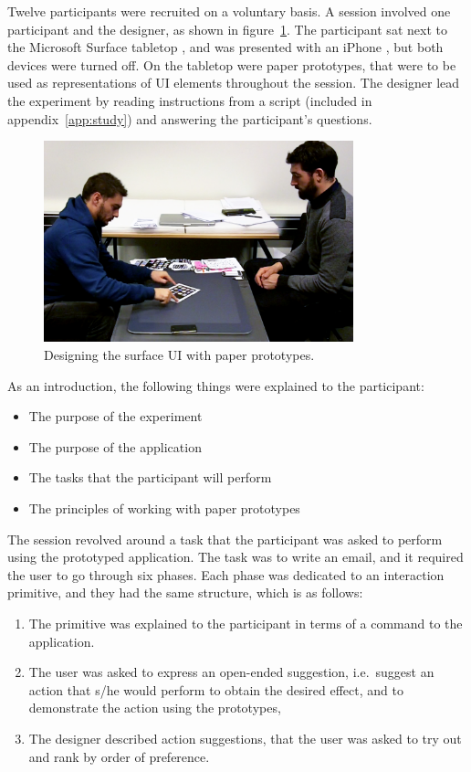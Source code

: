 Twelve participants were recruited on a voluntary basis.
A session involved one participant and the designer, as shown in figure~\ref{fig:studyScreenshot}.
The participant sat next to the Microsoft Surface tabletop \citep{ms}, and was presented with an iPhone \citep{iphone}, but both devices were turned off.
On the tabletop were paper prototypes, that were to be used as representations of UI elements throughout the session.
The designer lead the experiment by reading instructions from a script (included in appendix~\ref{app:study}) and answering the participant's questions.

\begin{figure}[htb]
  \centering
    \includegraphics[width=0.8\textwidth]{images/studyScreenshot}
  \caption{Designing the surface UI with paper prototypes.}
  \label{fig:studyScreenshot}
\end{figure}

As an introduction, the following things were explained to the participant:
\begin{itemize}
\item The purpose of the experiment
\item The purpose of the application
\item The tasks that the participant will perform
\item The principles of working with paper prototypes
\end{itemize}
\hfill
\linebreak
The session revolved around a task that the participant was asked to perform using the prototyped application.
The task was to write an email, and it required the user to go through six phases.
Each phase was dedicated to an interaction primitive, and they had the same structure, which is as follows:
\begin{enumerate}
\item The primitive was explained to the participant in terms of a command to the application.
\item The user was asked to express an open-ended suggestion, i.e.\ suggest an action that s/he would perform to obtain the desired effect, and to demonstrate the action using the prototypes,
\item The designer described action suggestions, that the user was asked to try out and rank by order of preference.
\end{enumerate}

